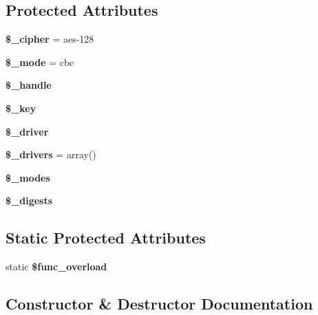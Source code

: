 \subsection*{Protected Attributes}
\begin{DoxyCompactItemize}
\item 
\mbox{\label{class_c_i___encryption_a6cf3b0d2d47e0fc1f342155221bd455e}} 
{\bfseries \$\+\_\+cipher} = \textquotesingle{}aes-\/128\textquotesingle{}
\item 
\mbox{\label{class_c_i___encryption_a2e70dfbb14a299da2155af7545d628c4}} 
{\bfseries \$\+\_\+mode} = \textquotesingle{}cbc\textquotesingle{}
\item 
\mbox{\label{class_c_i___encryption_ab67d1d614afb0fcad74491a1e0423a49}} 
{\bfseries \$\+\_\+handle}
\item 
\mbox{\label{class_c_i___encryption_a9beb7524db84427483692edc29d54efb}} 
{\bfseries \$\+\_\+key}
\item 
\mbox{\label{class_c_i___encryption_ae9a7072360a8934f6411334fc085fa0a}} 
{\bfseries \$\+\_\+driver}
\item 
\mbox{\label{class_c_i___encryption_a726b0c9d184833c48dc73fd3e9c778b1}} 
{\bfseries \$\+\_\+drivers} = array()
\item 
{\bfseries \$\+\_\+modes}
\item 
{\bfseries \$\+\_\+digests}
\end{DoxyCompactItemize}
\subsection*{Static Protected Attributes}
\begin{DoxyCompactItemize}
\item 
\mbox{\label{class_c_i___encryption_a704386c2daa990bc87ed1ff67ae9f505}} 
static {\bfseries \$func\+\_\+overload}
\end{DoxyCompactItemize}


\subsection{Constructor \& Destructor Documentation}
\mbox{\label{class_c_i___encryption_a12af3822c33cd340974fa41d93ac79d7}} 
